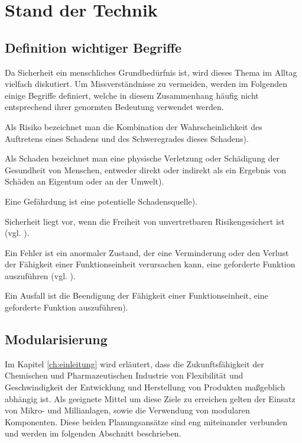 \chapter{Stand der Technik} \label{ch:sdt}
\section{Definition wichtiger Begriffe}
Da Sicherheit ein menschliches Grundbed\"urfnis ist, wird dieses Thema im Alltag vielfach diskutiert. Um Missverst\"andnisse zu vermeiden, werden im Folgenden einige Begriffe definiert, welche in diesem Zusammenhang h\"aufig nicht entsprechend ihrer genormten Bedeutung verwendet werden. 
\begin{defn}[Risiko] Als Risiko bezeichnet man die \glqq Kombination der Wahrscheinlichkeit des Auftretens eines Schadens und des Schweregrades dieses Schadens).
\end{defn}
\begin{defn}[Schaden] Als Schaden bezeichnet man eine \glqq physische Verletzung oder Sch\"adigung der Gesundheit von Menschen, entweder direkt oder indirekt als ein Ergebnis von Sch\"aden an Eigentum oder an der Umwelt).
\end{defn}
\begin{defn} Eine Gef\"ahrdung ist eine \glqq potentielle Schadensquelle).
\end{defn}
\begin{defn}[Sicherheit] Sicherheit liegt vor, wenn die \glqq Freiheit von unvertretbaren Risiken\grqq { }gesichert ist {(vgl. \cite[Abs. 3.2.67]{din61511_1} }).
\end{defn}
\begin{defn}[Fehler] Ein Fehler ist ein \glqq anormaler Zustand, der eine Verminderung oder den Verlust der F\"ahigkeit einer Funktionseinheit verursachen kann, eine geforderte Funktion auszuf\"uhren\grqq { } {(vgl. \cite[Abs. 3.2.21]{din61511_1} }).
\end{defn}
\begin{defn}[Ausfall] Ein Ausfall ist die \glqq Beendigung der F\"ahigkeit einer Funktionseinheit, eine geforderte Funktion auszuf\"uhren).
\end{defn}

\section{Modularisierung}\label{sec:sdt_modularisierung}
Im Kapitel \ref{ch:einleitung} wird erl\"autert, dass die Zukunftsf\"ahigkeit der Chemischen und Pharmazeutischen Industrie von Flexibilit\"at und Geschwindigkeit der Entwicklung und Herstellung von Produkten ma\ss{}geblich abh\"angig ist. Als geeignete Mittel um diese Ziele zu erreichen gelten der Einsatz von Mikro- und Millianlagen, sowie die Verwendung von modularen Komponenten. Diese beiden Planungsans\"atze sind eng miteinander verbunden und werden im folgenden Abschnitt beschrieben.  

